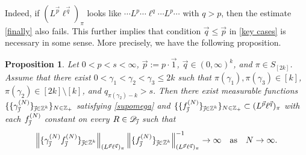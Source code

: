 \documentclass[11pt, reqno]{amsart}
\newtheorem{proposition}[theorem]{Proposition}
\theoremstyle{definition}
\theoremstyle{remark}
\numberwithin{equation}{section}
\newcommand{\Z}{\mathbb Z}
\newcommand{\vj}{\vec{\textit{\j}}}
\newcommand{\vp}{\vec p}
\newcommand{\vq}{\vec q}
\begin{document}
Indeed, if $(L^{\vp}\ell^{\vq})_\pi$ looks like
$\cdots L^p\cdots\ell^q\cdots L^p\cdots$ with $q>p$,
then the estimate \eqref{finally} also fails.
This further implies that condition $\vq\le\vp$ in \eqref{key cases}
is necessary in some sense.
More precisely, we have the following proposition.

\begin{proposition}\label{counterexamplecom}
Let $0<p<s<\infty$, $\vec p:=p\cdot\vec 1$, $\vec q\in(0,\infty)^k$,
and $\pi\in S_{[2k]}$.
Assume that there exist
$0<\gamma_1<\gamma_2<\gamma_3\le 2k$
such that
$\pi(\gamma_1),\pi(\gamma_3)\in[k]$,
$\pi(\gamma_2)\in[2k]\setminus[k]$, and
$q_{\pi(\gamma_2)-k}>s.$
Then there exist measurable functions
$\{\{\gamma^{(N)}_{\vj}\}_{\vj\in\mathbb Z^k}\}_{N\in\Z_+}$ satisfying \eqref{supomega}
and
$\{\{f^{(N)}_{\vj}\}_{\vj\in\mathbb Z^k}\}_{N\in\Z_+}\subset (L^{\vec p}\ell^{\vec q})_\pi$
with each $f^{(N)}_{\vj}$ constant on every $R\in\mathscr D_{\vj}$ such that
$$
\left\|\{\gamma_{\vj}^{(N)} f^{(N)}_{\vj}\}_{\vj\in\Z^k}
\right\|_{(L^{\vp}\ell^{\vq})_\pi}
\left\|\{f^{(N)}_{\vj}\}_{\vj\in\Z^k}\right\|^{-1}_{(L^{\vp}\ell^{\vq})_\pi}
\to \infty
\quad\text{as}\quad N\to\infty.
$$
\end{proposition}
\end{document}
